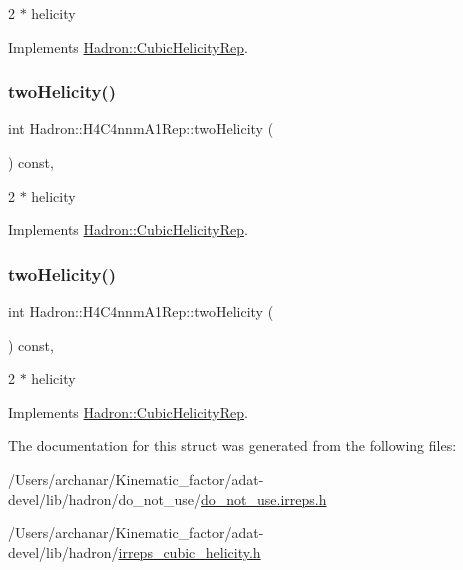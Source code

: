 2 $\ast$ helicity 

Implements \mbox{\hyperlink{structHadron_1_1CubicHelicityRep_af507aa56fc2747eacc8cb6c96db31ecc}{Hadron\+::\+Cubic\+Helicity\+Rep}}.

\mbox{\label{structHadron_1_1H4C4nnmA1Rep_a8f570a8c9ad6fc04e9458e44562b8b21}} 
\subsubsection{\texorpdfstring{twoHelicity()}{twoHelicity()}\hspace{0.1cm}{\footnotesize\ttfamily [2/3]}}
{\footnotesize\ttfamily int Hadron\+::\+H4\+C4nnm\+A1\+Rep\+::two\+Helicity (\begin{DoxyParamCaption}{ }\end{DoxyParamCaption}) const\hspace{0.3cm}{\ttfamily [inline]}, {\ttfamily [virtual]}}

2 $\ast$ helicity 

Implements \mbox{\hyperlink{structHadron_1_1CubicHelicityRep_af507aa56fc2747eacc8cb6c96db31ecc}{Hadron\+::\+Cubic\+Helicity\+Rep}}.

\mbox{\label{structHadron_1_1H4C4nnmA1Rep_a8f570a8c9ad6fc04e9458e44562b8b21}} 
\subsubsection{\texorpdfstring{twoHelicity()}{twoHelicity()}\hspace{0.1cm}{\footnotesize\ttfamily [3/3]}}
{\footnotesize\ttfamily int Hadron\+::\+H4\+C4nnm\+A1\+Rep\+::two\+Helicity (\begin{DoxyParamCaption}{ }\end{DoxyParamCaption}) const\hspace{0.3cm}{\ttfamily [inline]}, {\ttfamily [virtual]}}

2 $\ast$ helicity 

Implements \mbox{\hyperlink{structHadron_1_1CubicHelicityRep_af507aa56fc2747eacc8cb6c96db31ecc}{Hadron\+::\+Cubic\+Helicity\+Rep}}.



The documentation for this struct was generated from the following files\+:\begin{DoxyCompactItemize}
\item 
/\+Users/archanar/\+Kinematic\+\_\+factor/adat-\/devel/lib/hadron/do\+\_\+not\+\_\+use/\mbox{\hyperlink{adat-devel_2lib_2hadron_2do__not__use_2do__not__use_8irreps_8h}{do\+\_\+not\+\_\+use.\+irreps.\+h}}\item 
/\+Users/archanar/\+Kinematic\+\_\+factor/adat-\/devel/lib/hadron/\mbox{\hyperlink{adat-devel_2lib_2hadron_2irreps__cubic__helicity_8h}{irreps\+\_\+cubic\+\_\+helicity.\+h}}\end{DoxyCompactItemize}
